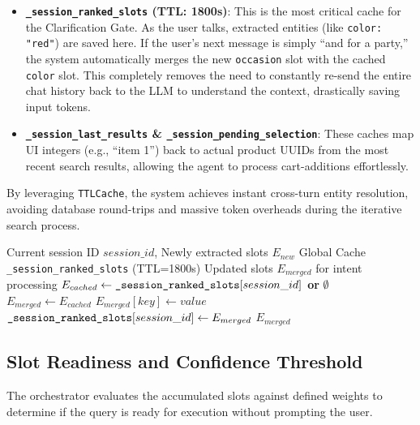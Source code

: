 \begin{itemize}
    \item \textbf{\texttt{\_session\_ranked\_slots} (TTL: 1800s)}: This is the most critical cache for the Clarification Gate. As the user talks, extracted entities (like \texttt{color: "red"}) are saved here. If the user's next message is simply ``and for a party,'' the system automatically merges the new \texttt{occasion} slot with the cached \texttt{color} slot. This completely removes the need to constantly re-send the entire chat history back to the LLM to understand the context, drastically saving input tokens.
    \item \textbf{\texttt{\_session\_last\_results} \& \texttt{\_session\_pending\_selection}}: These caches map UI integers (e.g., ``item 1'') back to actual product UUIDs from the most recent search results, allowing the agent to process cart-additions effortlessly.
\end{itemize}

By leveraging \texttt{TTLCache}, the system achieves instant cross-turn entity resolution, avoiding database round-trips and massive token overheads during the iterative search process.

\begin{algorithm}[H]
\caption{Short-Term Memory Management via TTLCache}\label{alg:ttlcache_memory}
\begin{algorithmic}[1]
\Require Current session ID $session\_id$, Newly extracted slots $E_{new}$
\Require Global Cache \texttt{\_session\_ranked\_slots} (TTL=1800s)
\Ensure Updated slots $E_{merged}$ for intent processing
    \State $E_{cached} \gets \text{\texttt{\_session\_ranked\_slots}}[session\_id]$ \textbf{or} $\emptyset$
    \State $E_{merged} \gets E_{cached}$
            \State $E_{merged}[key] \gets value$
        \EndIf
    \EndFor
    \State $\text{\texttt{\_session\_ranked\_slots}}[session\_id] \gets E_{merged}$
    \State \Return $E_{merged}$
\EndFunction
\end{algorithmic}
\end{algorithm}

\subsection{Slot Readiness and Confidence Threshold}
The orchestrator evaluates the accumulated slots against defined weights to determine if the query is ready for execution without prompting the user.

